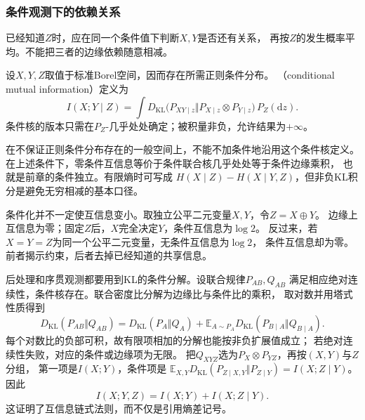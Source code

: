 \subsubsection{条件观测下的依赖关系}
\label{sec:information-conditional-mi}

已经知道\(Z\)时，应在同一个条件值下判断\(X,Y\)是否还有关系，
再按\(Z\)的发生概率平均。不能把三者的边缘依赖随意相减。

\begin{definition}[条件互信息]
\label{def:information-conditional-mi}
设\(X,Y,Z\)取值于标准Borel空间，因而存在所需正则条件分布。
（conditional mutual information）定义为
\begin{equation}
  I(X;Y\mid Z)
  =\int D_{\mathrm{KL}}\bigl(
    P_{XY\mid z}\Vert P_{X\mid z}\otimes P_{Y\mid z}\bigr)\,P_Z(\mathrm dz).
  \label{eq:information-conditional-mutual-information}
\end{equation}
条件核的版本只需在\(P_Z\)-几乎处处确定；被积量非负，允许结果为\(+\infty\)。
\end{definition}

在不保证正则条件分布存在的一般空间上，不能不加条件地沿用这个条件核定义。
在上述条件下，零条件互信息等价于条件联合核几乎处处等于条件边缘乘积，
也就是前章的条件独立。有限熵时可写成
\(H(X\mid Z)-H(X\mid Y,Z)\)，但非负KL积分是避免无穷相减的基本口径。

条件化并不一定使互信息变小。取独立公平二元变量\(X,Y\)，令\(Z=X\oplus Y\)。
边缘上互信息为零；固定\(Z\)后，\(X\)完全决定\(Y\)，条件互信息为\(\log2\)。
反过来，若\(X=Y=Z\)为同一个公平二元变量，无条件互信息为\(\log2\)，
条件互信息却为零。前者揭示约束，后者去掉已经知道的共享信息。

后处理和序贯观测都要用到KL的条件分解。设联合规律\(P_{AB},Q_{AB}\)
满足相应绝对连续性，条件核存在。联合密度比分解为边缘比与条件比的乘积，
取对数并用塔式性质得到
\begin{equation}
  D_{\mathrm{KL}}(P_{AB}\Vert Q_{AB})
  =D_{\mathrm{KL}}(P_A\Vert Q_A)
   +\mathbb E_{A\sim P_A}
       D_{\mathrm{KL}}(P_{B\mid A}\Vert Q_{B\mid A}).
  \label{eq:information-kl-conditional-chain}
\end{equation}
每个对数比的负部可积，故有限项相加的分解也能按非负扩展值成立；
若绝对连续性失败，对应的条件或边缘项为无限。
把\(Q_{XYZ}\)选为\(P_X\otimes P_{YZ}\)，再按\((X,Y)\)与\(Z\)分组，
第一项是\(I(X;Y)\)，条件项是
\(\mathbb E_{X,Y}D_{\mathrm{KL}}(P_{Z\mid X,Y}\Vert P_{Z\mid Y})
=I(X;Z\mid Y)\)。因此
\[
  I(X;Y,Z)=I(X;Y)+I(X;Z\mid Y).
\]
这证明了互信息链式法则，而不仅是引用熵差记号。

